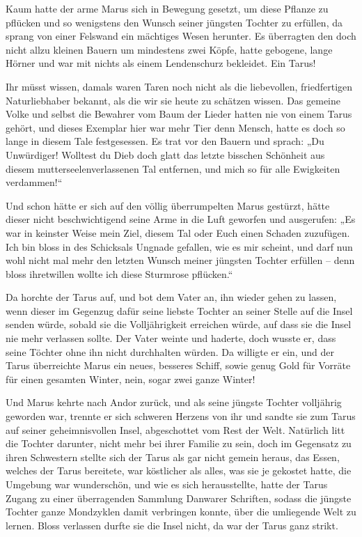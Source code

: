 \documentclass[10pt, a4paper, oneside]{book}
\begin{document}
Kaum hatte der arme Marus sich in Bewegung gesetzt, um diese Pflanze zu pflücken und so wenigstens den Wunsch seiner jüngsten Tochter zu erfüllen, da sprang von einer Felswand ein mächtiges Wesen herunter. Es überragten den doch nicht allzu kleinen Bauern um mindestens zwei Köpfe, hatte gebogene, lange Hörner und war mit nichts als einem Lendenschurz bekleidet. Ein Tarus!

Ihr müsst wissen, damals waren Taren noch nicht als die liebevollen, friedfertigen Naturliebhaber bekannt, als die wir sie heute zu schätzen wissen. Das gemeine Volke und selbst die Bewahrer vom Baum der Lieder hatten nie von einem Tarus gehört, und dieses Exemplar hier war mehr Tier denn Mensch, hatte es doch so lange in diesem Tale festgesessen. Es trat vor den Bauern und sprach: „Du Unwürdiger! Wolltest du Dieb doch glatt das letzte bisschen Schönheit aus diesem mutterseelenverlassenen Tal entfernen, und mich so für alle Ewigkeiten verdammen!“

Und schon hätte er sich auf den völlig überrumpelten Marus gestürzt, hätte dieser nicht beschwichtigend seine Arme in die Luft geworfen und ausgerufen: „Es war in keinster Weise mein Ziel, diesem Tal oder Euch einen Schaden zuzufügen. Ich bin bloss in des Schicksals Ungnade gefallen, wie es mir scheint, und darf nun wohl nicht mal mehr den letzten Wunsch meiner jüngsten Tochter erfüllen – denn bloss ihretwillen wollte ich diese Sturmrose pflücken.“

Da horchte der Tarus auf, und bot dem Vater an, ihn wieder gehen zu lassen, wenn dieser im Gegenzug dafür seine liebste Tochter an seiner Stelle auf die Insel senden würde, sobald sie die Volljährigkeit erreichen würde, auf dass sie die Insel nie mehr verlassen sollte. Der Vater weinte und haderte, doch wusste er, dass seine Töchter ohne ihn nicht durchhalten würden. Da willigte er ein, und der Tarus überreichte Marus ein neues, besseres Schiff, sowie genug Gold für Vorräte für einen gesamten Winter, nein, sogar zwei ganze Winter!

Und Marus kehrte nach Andor zurück, und als seine jüngste Tochter volljährig geworden war, trennte er sich schweren Herzens von ihr und sandte sie zum Tarus auf seiner geheimnisvollen Insel, abgeschottet vom Rest der Welt. Natürlich litt die Tochter darunter, nicht mehr bei ihrer Familie zu sein, doch im Gegensatz zu ihren Schwestern stellte sich der Tarus als gar nicht gemein heraus, das Essen, welches der Tarus bereitete, war köstlicher als alles, was sie je gekostet hatte, die Umgebung war wunderschön, und wie es sich herausstellte, hatte der Tarus Zugang zu einer überragenden Sammlung Danwarer Schriften, sodass die jüngste Tochter ganze Mondzyklen damit verbringen konnte, über die umliegende Welt zu lernen. Bloss verlassen durfte sie die Insel nicht, da war der Tarus ganz strikt.
\end{document}

